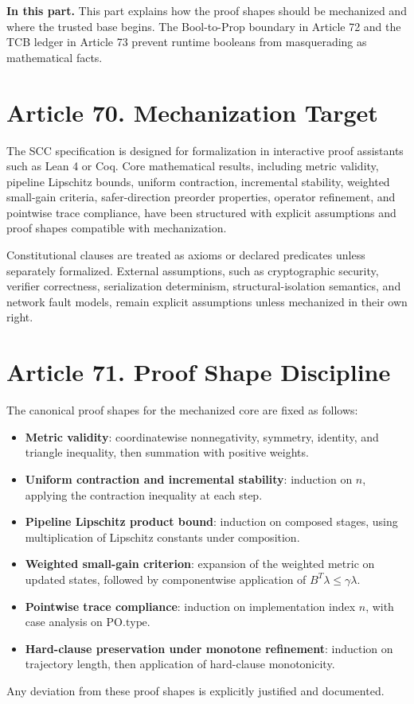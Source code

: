\documentclass[10pt,oneside]{article}
\theoremstyle{definition}
\theoremstyle{remark}
\newcommand{\PO}{\mathrm{PO}}
\newcommand{\PartIntro}[1]{\noindent\textbf{In this part.} #1\par\medskip}
\begin{document}
\PartIntro{This part explains how the proof shapes should be mechanized and where the trusted base begins. The Bool-to-Prop boundary in Article 72 and the TCB ledger in Article 73 prevent runtime booleans from masquerading as mathematical facts.}

\section{Article 70. Mechanization Target}
The SCC specification is designed for formalization in interactive proof assistants such as Lean 4 or Coq. Core mathematical results, including metric validity, pipeline Lipschitz bounds, uniform contraction, incremental stability, weighted small-gain criteria, safer-direction preorder properties, operator refinement, and pointwise trace compliance, have been structured with explicit assumptions and proof shapes compatible with mechanization.

Constitutional clauses are treated as axioms or declared predicates unless separately formalized. External assumptions, such as cryptographic security, verifier correctness, serialization determinism, structural-isolation semantics, and network fault models, remain explicit assumptions unless mechanized in their own right.

\section{Article 71. Proof Shape Discipline}
The canonical proof shapes for the mechanized core are fixed as follows:
\begin{itemize}
  \item \textbf{Metric validity}: coordinatewise nonnegativity, symmetry, identity, and triangle inequality, then summation with positive weights.
  \item \textbf{Uniform contraction and incremental stability}: induction on \(n\), applying the contraction inequality at each step.
  \item \textbf{Pipeline Lipschitz product bound}: induction on composed stages, using multiplication of Lipschitz constants under composition.
  \item \textbf{Weighted small-gain criterion}: expansion of the weighted metric on updated states, followed by componentwise application of \(B^T\lambda\leq\gamma\lambda\).
  \item \textbf{Pointwise trace compliance}: induction on implementation index \(n\), with case analysis on \(\PO.\mathrm{type}\).
  \item \textbf{Hard-clause preservation under monotone refinement}: induction on trajectory length, then application of hard-clause monotonicity.
\end{itemize}
Any deviation from these proof shapes is explicitly justified and documented.
\end{document}
